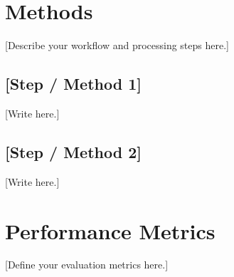 \section{Methods}
\label{sec:workflow}


[Describe your workflow and processing steps here.]

\subsection{[Step / Method 1]}

[Write here.]

\subsection{[Step / Method 2]}

[Write here.]

\section{Performance Metrics}
\label{sec:metrics}


[Define your evaluation metrics here.]




